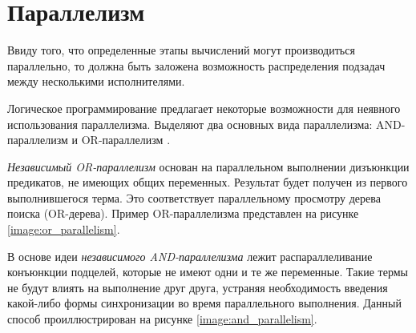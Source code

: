 \section{Параллелизм}
Ввиду того, что определенные этапы вычислений могут производиться параллельно, то должна быть заложена возможность распределения подзадач между несколькими исполнителями.

Логическое программирование предлагает некоторые возможности для неявного использования параллелизма. Выделяют два основных вида параллелизма: AND-параллелизм и OR-параллелизм \cite{parallel_logic}.

\textit{Независимый OR-параллелизм} основан на параллельном выполнении дизъюнкции предикатов, не имеющих общих переменных. Результат будет получен из первого выполнившегося терма. Это соответствует параллельному просмотру дерева поиска (OR-дерева). Пример OR-параллелизма представлен на рисунке \ref{image:or_parallelism}.

\begin{figure}[H]
\end{figure} 

\newpage

В основе идеи \textit{независимого AND-параллелизма} лежит распараллеливание конъюнкции подцелей, которые не имеют одни и те же переменные. Такие термы не будут влиять на выполнение друг друга, устраняя необходимость введения какой-либо формы синхронизации во время параллельного выполнения. Данный способ проиллюстрирован на рисунке \ref{image:and_parallelism}. 

\begin{figure}[H]
\end{figure} 

